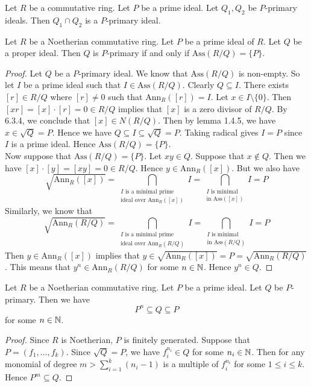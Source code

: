 \documentclass[a4paper]{article}
\begin{document}
\begin{lmm}{}{} Let $R$ be a commutative ring. Let $P$ be a prime ideal. Let $Q_1,Q_2$ be $P$-primary ideals. Then $Q_1\cap Q_2$ is a $P$-primary ideal. 
\end{lmm}

\begin{prp}{}{} Let $R$ be a Noetherian commutative ring. Let $P$ be a prime ideal of $R$. Let $Q$ be a proper ideal. Then $Q$ is $P$-primary if and only if $\text{Ass}(R/Q)=\{P\}$. 
\begin{proof}
Let $Q$ be a $P$-primary ideal. We know that $\text{Ass}(R/Q)$ is non-empty. So let $I$ be a prime ideal such that $I\in\text{Ass}(R/Q)$. Clearly $Q\subseteq I$. There exists $[r]\in R/Q$ where $[r]\neq 0$ such that $\text{Ann}_R([r])=I$. Let $x\in I\setminus\{0\}$. Then $[xr]=[x]\cdot[r]=0\in R/Q$ implies that $[x]$ is a zero divisor of $R/Q$. By 6.3.4, we conclude that $[x]\in N(R/Q)$. Then by lemma 1.4.5, we have $x\in\sqrt{Q}=P$. Hence we have $Q\subseteq I\subseteq\sqrt{Q}=P$. Taking radical gives $I=P$ since $I$ is a prime ideal. Hence $\text{Ass}(R/Q)=\{P\}$. \\

Now suppose that $\text{Ass}(R/Q)=\{P\}$. Let $xy\in Q$. Suppose that $x\notin Q$. Then we have $[x]\cdot[y]=[xy]=0\in R/Q$. Hence $y\in\text{Ann}_R([x])$. But we also have $$\sqrt{\text{Ann}_R([x])}=\bigcap_{\substack{I\text{ is a minimal prime}\\\text{ideal over Ann}_R([x])}}I=\bigcap_{\substack{I\text{ is minimal}\\\text{in Ass}([x])}}I=P$$ Similarly, we know that $$\sqrt{\text{Ann}_R(R/Q)}=\bigcap_{\substack{I\text{ is a minimal prime}\\\text{ideal over Ann}_R(R/Q)}}I=\bigcap_{\substack{I\text{ is minimal}\\\text{in Ass}(R/Q)}}I=P$$ Then $y\in\text{Ann}_R([x])$ implies that $y\in\sqrt{\text{Ann}_R([x])}=P=\sqrt{\text{Ann}_R(R/Q)}$. This means that $y^n\in\text{Ann}_R(R/Q)$ for some $n\in\mathbb{N}$. Hence $y^n\in Q$. 
\end{proof}
\end{prp}

\begin{lmm}{}{} Let $R$ be a Noetherian commutative ring. Let $P$ be a prime ideal. Let $Q$ be $P$-primary. Then we have $$P^n\subseteq Q\subseteq P$$ for some $n\in\mathbb{N}$. 
\begin{proof}
Since $R$ is Noetherian, $P$ is finitely generated. Suppose that $P=(f_1,\dots,f_k)$. Since $\sqrt{Q}=P$, we have $f_i^{n_i}\in Q$ for some $n_i\in\mathbb{N}$. Then for any monomial of degree $m>\sum_{i=1}^k(n_i-1)$ is a multiple of $f_i^{n_i}$ for some $1\leq i\leq k$. Hence $P^m\subseteq Q$. 
\end{proof}
\end{lmm}
\end{document}
